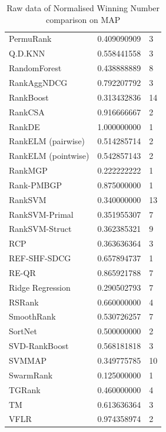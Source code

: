 \documentclass{sig-alternate-2013}
\begin{document}
\begin{table}
\begin{tabular}{l|l|l}
PermuRank & 0.409090909 & 3 \\ 
Q.D.KNN & 0.558441558 & 3 \\ 
RandomForest & 0.438888889 & 8 \\ 
RankAggNDCG & 0.792207792 & 3 \\ 
RankBoost & 0.313432836 & 14 \\ 
RankCSA & 0.916666667 & 2 \\ 
RankDE & 1.000000000 & 1 \\ 
RankELM (pairwise) & 0.514285714 & 2 \\ 
RankELM (pointwise) & 0.542857143 & 2 \\ 
RankMGP & 0.222222222 & 1 \\ 
Rank-PMBGP & 0.875000000 & 1 \\ 
RankSVM & 0.340000000 & 13 \\ 
RankSVM-Primal & 0.351955307 & 7 \\ 
RankSVM-Struct & 0.362385321 & 9 \\ 
RCP & 0.363636364 & 3 \\ 
REF-SHF-SDCG & 0.657894737 & 1 \\ 
RE-QR & 0.865921788 & 7 \\ 
Ridge Regression & 0.290502793 & 7 \\ 
RSRank & 0.660000000 & 4 \\ 
SmoothRank & 0.530726257 & 7 \\ 
SortNet & 0.500000000 & 2 \\ 
SVD-RankBoost & 0.568181818 & 3 \\ 
SVMMAP & 0.349775785 & 10 \\ 
SwarmRank & 0.125000000 & 1 \\ 
TGRank & 0.460000000 & 4 \\ 
TM & 0.613636364 & 3 \\ 
VFLR & 0.974358974 & 2 \\
\end{tabular}
\caption{Raw data of Normalised Winning Number comparison on MAP}
\label{tab:raw_data_norm_winnum_map}
\end{table}
\end{document}
